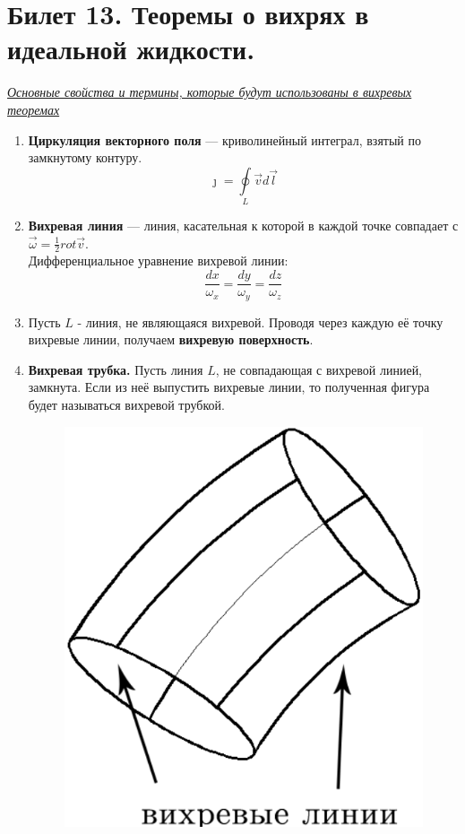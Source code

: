 \newpage
\section{Билет 13. Теоремы о вихрях в идеальной жидкости.}
\begin{center}
	\textit{\underline{Основные свойства и термины, которые будут использованы в вихревых теоремах}}
\end{center}
\begin{enumerate}
\item 
\textbf{Циркуляция векторного поля} — криволинейный интеграл, взятый по замкнутому контуру.
$$\jmath = \oint  \limits_{L}\vec{v}d\vec{l}$$
\item
\textbf{Вихревая линия} — линия, касательная к которой в каждой точке совпадает с $\vec{\omega} = \frac{1}{2}rot\vec{v}$.\\ Дифференциальное уравнение вихревой линии:
$$\frac{dx}{\omega_x} =\frac{dy}{\omega_y} = \frac{dz}{\omega_z}$$
\item 
Пусть $L$ - линия, не являющаяся вихревой. Проводя через каждую её точку вихревые линии, получаем \textbf{вихревую поверхность}. 
\item
\textbf{Вихревая трубка.}
Пусть линия $L$, не совпадающая с вихревой линией, замкнута. Если из неё выпустить вихревые линии, то полученная фигура будет называться вихревой трубкой.
\begin{figure}[!htbp]
    \begin{minipage}{0.33\linewidth}
        \centering
        \includegraphics[width=\linewidth]{13/vihre_trubka.png}

\end{minipage}
\end{figure}
\end{enumerate}
